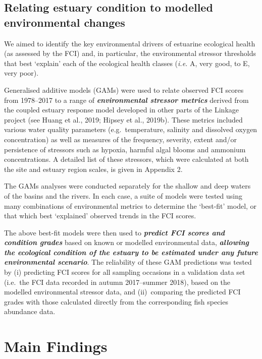 \documentclass[
]{book}
\begin{document}
\hypertarget{relating-estuary-condition-to-modelled-environmental-changes}{%
\subsection{Relating estuary condition to modelled environmental changes}\label{relating-estuary-condition-to-modelled-environmental-changes}}

We aimed to identify the key environmental drivers of estuarine ecological health (as assessed by the FCI) and, in particular, the environmental stressor thresholds that best `explain' each of the ecological health classes (\emph{i.e.} A, very good, to E, very poor).

Generalised additive models (GAMs) were used to relate observed FCI scores from 1978--2017 to a range of \textbf{\emph{environmental stressor metrics}} derived from the coupled estuary response model developed in other parts of the Linkage project (see Huang et al., 2019; Hipsey et al., 2019b). These metrics included various water quality parameters (e.g.~temperature, salinity and dissolved oxygen concentration) as well as measures of the frequency, severity, extent and/or persistence of stressors such as hypoxia, harmful algal blooms and ammonium concentrations. A detailed list of these stressors, which were calculated at both the site and estuary region scales, is given in Appendix 2.

The GAMs analyses were conducted separately for the shallow and deep waters of the basins and the rivers. In each case, a suite of models were tested using many combinations of environmental metrics to determine the `best-fit' model, or that which best `explained' observed trends in the FCI scores.~

The above best-fit models were then used to \textbf{\emph{predict FCI scores and condition grades}} based on known or modelled environmental data, \textbf{\emph{allowing the ecological condition of the estuary to be estimated under any future environmental scenario}}. The reliability of these GAM predictions was tested by (i) predicting FCI scores for all sampling occasions in a validation data set (i.e.~the FCI data recorded in autumn 2017--summer 2018), based on the modelled environmental stressor data, and (ii)~comparing the predicted FCI grades with those calculated directly from the corresponding fish species abundance data.

\hypertarget{main-findings-1}{%
\section{Main Findings}\label{main-findings-1}}
\end{document}
